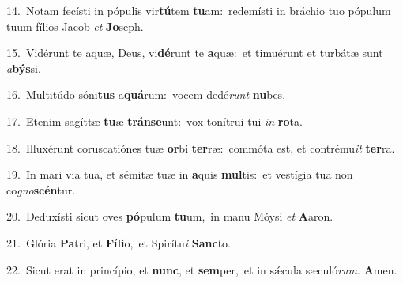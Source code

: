 {\numbfont\textcolor{\numbcolor}{14.}}~Notam fecísti in pópulis vir\-\textbf{tú}\-tem \textbf{tu}\-am:~\star redemísti in bráchio tuo pópulum tuum fílios Jacob \textit{et} \textbf{Jo}\-seph.\par
{\numbfont\textcolor{\numbcolor}{15.}}~Vidérunt te aquæ, Deus, vi\-\textbf{dé}\-runt te \textbf{a}\-quæ:~\star et timuérunt et turbátæ sunt \textit{a}\-\textbf{býs}si.\par
{\numbfont\textcolor{\numbcolor}{16.}}~Multitúdo sóni\textbf{tus} a\-\textbf{quá}\-rum:~\star vocem dedé\textit{runt} \textbf{nu}\-bes.\par
{\numbfont\textcolor{\numbcolor}{17.}}~Etenim sagíttæ \textbf{tu}\-æ \textbf{tráns}\-\textbf{e}unt:~\star vox tonítrui tui \textit{in} \textbf{ro}\-ta.\par
{\numbfont\textcolor{\numbcolor}{18.}}~Illuxérunt coruscatiónes tuæ \textbf{or}\-bi \textbf{ter}\-ræ:~\star commóta est, et contrému\textit{it} \textbf{ter}\-ra.\par
{\numbfont\textcolor{\numbcolor}{19.}}~In mari via tua, et sémitæ tuæ in \textbf{a}\-quis \textbf{mul}\-tis:~\star et vestígia tua non co\-\textit{gno}\-\textbf{scén}tur.\par
{\numbfont\textcolor{\numbcolor}{20.}}~Deduxísti sicut oves \textbf{pó}\-pulum \textbf{tu}\-um,~\star in manu Móysi \textit{et} \textbf{A}\-aron.\par
{\numbfont\textcolor{\numbcolor}{21.}}~Glória \textbf{Pa}\-tri, et \textbf{Fí}\-\textbf{li}o,~\star et Spirítu\textit{i} \textbf{Sanc}\-to.\par
{\numbfont\textcolor{\numbcolor}{22.}}~Sicut erat in princípio, et \textbf{nunc}\-, et \textbf{sem}\-per,~\star et in sǽcula sæculó\-\textit{rum}\-. \textbf{A}\-men.\par

